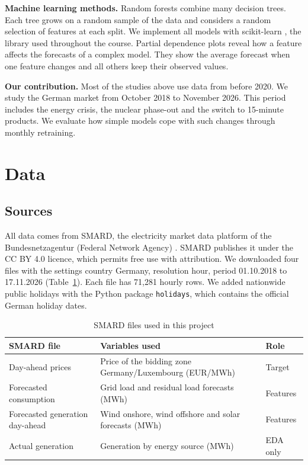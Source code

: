 \documentclass[12pt,oneside]{article}
\begin{document}
\textbf{Machine learning methods.} Random forests \citep{breiman2001} combine many decision trees. Each tree grows on a random sample of the data and considers a random selection of features at each split. We implement all models with scikit-learn \citep{pedregosa2011}, the library used throughout the course. Partial dependence plots \citep{friedman2001} reveal how a feature affects the forecasts of a complex model. They show the average forecast when one feature changes and all others keep their observed values.

\textbf{Our contribution.} Most of the studies above use data from before 2020. We study the German market from October 2018 to November 2026. This period includes the energy crisis, the nuclear phase-out and the switch to 15-minute products. We evaluate how simple models cope with such changes through monthly retraining.

\section{Data} \label{sec:data}

\subsection{Sources}

All data comes from SMARD, the electricity market data platform of the Bundesnetzagentur (Federal Network Agency) \citep{smard2026}. SMARD publishes it under the CC BY 4.0 licence, which permits free use with attribution. We downloaded four files with the settings country Germany, resolution hour, period 01.10.2018 to 17.11.2026 (Table~\ref{tab:files}). Each file has 71,281 hourly rows. We added nationwide public holidays with the Python package \texttt{holidays}, which contains the official German holiday dates.

\begin{table}[!htbp]
    \centering
    \caption{SMARD files used in this project}
    \begin{tabularx}{\textwidth}{lXl}
        \toprule
        SMARD file & Variables used & Role \\
        \midrule
        Day-ahead prices & Price of the bidding zone Germany/Luxembourg (EUR/MWh) & Target \\
        Forecasted consumption & Grid load and residual load forecasts (MWh) & Features \\
        Forecasted generation day-ahead & Wind onshore, wind offshore and solar forecasts (MWh) & Features \\
        Actual generation & Generation by energy source (MWh) & EDA only \\
        \bottomrule
    \end{tabularx}
    \label{tab:files}
\end{table}
\end{document}
